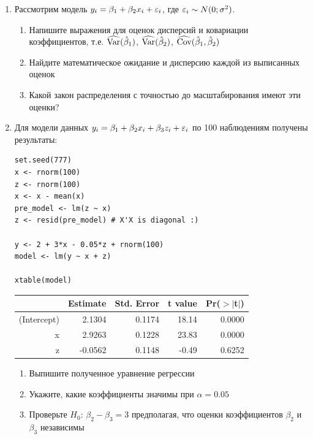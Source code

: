 \documentclass[12pt, a4paper]{article}
\begin{document}
\begin{enumerate}
\item Рассмотрим модель $y_i=\beta_1 + \beta_2 x_i +\varepsilon_i$, где $\varepsilon_i \sim N(0;\sigma^2)$.

\begin{enumerate}
\item Напишите выражения для оценок дисперсий и ковариации коэффициентов, т.е. $\widehat{\operatorname{Var}}(\hat{\beta}_1)$, $\widehat{\operatorname{Var}}(\hat{\beta}_2)$, $\widehat{\operatorname{Cov}}(\hat{\beta}_1,\hat{\beta}_2)$
\item Найдите математическое ожидание и дисперсию каждой из выписанных оценок
\item Какой закон распределения с точностью до масштабирования имеют эти оценки?
\end{enumerate}

\item Для модели данных $y_i=\beta_1 + \beta_2 x_i + \beta_3 z_i + \varepsilon_i$ по 100 наблюдениям получены результаты:

\begin{verbatim}
set.seed(777)
x <- rnorm(100)
z <- rnorm(100)
x <- x - mean(x)
pre_model <- lm(z ~ x)
z <- resid(pre_model) # X'X is diagonal :)

y <- 2 + 3*x - 0.05*z + rnorm(100)
model <- lm(y ~ x + z)

xtable(model)
\end{verbatim}

\begin{table}[ht]
\centering
\begin{tabular}{rrrrr}
  \hline
 & Estimate & Std. Error & t value & Pr($>$$|$t$|$) \\
  \hline
(Intercept) & 2.1304 & 0.1174 & 18.14 & 0.0000 \\
  x & 2.9263 & 0.1228 & 23.83 & 0.0000 \\
  z & -0.0562 & 0.1148 & -0.49 & 0.6252 \\
   \hline
\end{tabular}
\end{table}

\begin{enumerate}
\item Выпишите полученное уравнение регрессии
\item Укажите, какие коэффициенты значимы при $\alpha=0.05$
\item Проверьте $H_0$: $\beta_2-\beta_3=3$ предполагая, что оценки коэффициентов $\beta_2$ и  $\beta_3$ независимы
\end{enumerate}


\end{enumerate}
\end{document}
